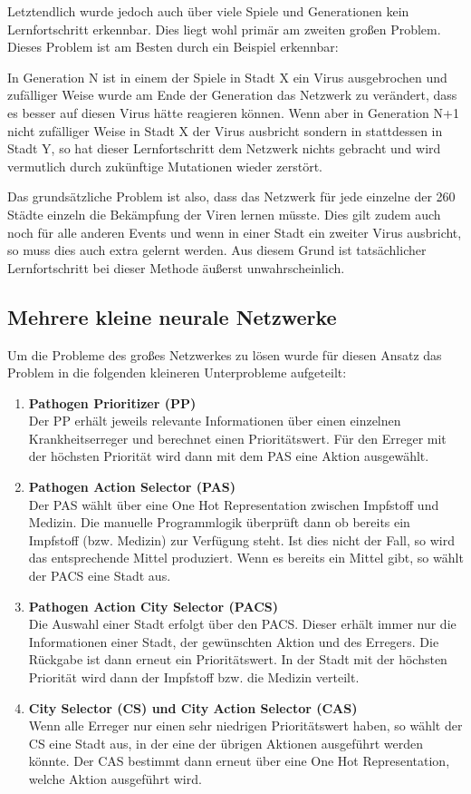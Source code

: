 \documentclass[11pt, twocolumn]{article}
\begin{document}
Letztendlich wurde jedoch auch über viele Spiele und Generationen kein Lernfortschritt erkennbar. Dies liegt wohl primär am zweiten großen Problem. Dieses Problem ist am Besten durch ein Beispiel erkennbar:

In Generation N ist in einem der Spiele in Stadt X ein Virus ausgebrochen und zufälliger Weise wurde am Ende der Generation das Netzwerk zu verändert, dass es besser auf diesen Virus hätte reagieren können. Wenn aber in Generation N+1 nicht zufälliger Weise in Stadt X der Virus ausbricht sondern in stattdessen in Stadt Y, so hat dieser Lernfortschritt dem Netzwerk nichts gebracht und wird vermutlich durch zukünftige Mutationen wieder zerstört.

Das grundsätzliche Problem ist also, dass das Netzwerk für jede einzelne der 260 Städte einzeln die Bekämpfung der Viren lernen müsste. Dies gilt zudem auch noch für alle anderen Events und wenn in einer Stadt ein zweiter Virus ausbricht, so muss dies auch extra gelernt werden. Aus diesem Grund ist tatsächlicher Lernfortschritt bei dieser Methode äußerst unwahrscheinlich.



\subsection{Mehrere kleine neurale Netzwerke}
Um die Probleme des großes Netzwerkes zu lösen wurde für diesen Ansatz das Problem in die folgenden kleineren Unterprobleme aufgeteilt:

\begin{enumerate}
	\item \textbf{Pathogen Prioritizer (PP)} \\
		Der PP erhält jeweils relevante Informationen über einen einzelnen Krankheitserreger und berechnet einen Prioritätswert. Für den Erreger mit der höchsten Priorität wird dann mit dem PAS eine Aktion ausgewählt.
	\item \textbf{Pathogen Action Selector (PAS)}\\
		Der PAS wählt über eine One Hot Representation zwischen Impfstoff und Medizin. Die manuelle Programmlogik überprüft dann ob bereits ein Impfstoff (bzw. Medizin) zur Verfügung steht. Ist dies nicht der Fall, so wird das entsprechende Mittel produziert. Wenn es bereits ein Mittel gibt, so wählt der PACS eine Stadt aus.
	\item \textbf{Pathogen Action City Selector (PACS)} \\
		Die Auswahl einer Stadt erfolgt über den PACS. Dieser erhält immer nur die Informationen einer Stadt, der gewünschten Aktion und des Erregers. Die Rückgabe ist dann erneut ein Prioritätswert. In der Stadt mit der höchsten Priorität wird dann der Impfstoff bzw. die Medizin verteilt.
	\item \textbf{City Selector (CS) und City Action Selector (CAS)}\\
		Wenn alle Erreger nur einen sehr niedrigen Prioritätswert haben, so wählt der CS eine Stadt aus, in der eine der übrigen Aktionen ausgeführt werden könnte. Der CAS bestimmt dann erneut über eine One Hot Representation, welche Aktion ausgeführt wird.
\end{enumerate}
\end{document}
